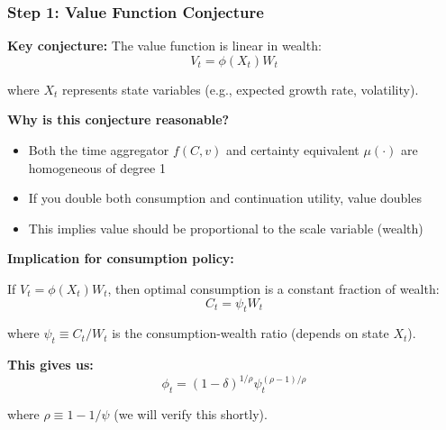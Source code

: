 \documentclass{beamer}
\begin{document}
\begin{frame}[allowframebreaks]
    \frametitle{Step 1: Value Function Conjecture}
    
    \textbf{Key conjecture:} The value function is linear in wealth:
    \begin{equation*}
        V_t = \phi(X_t) W_t
    \end{equation*}
    
    where $X_t$ represents state variables (e.g., expected growth rate, volatility).
    
    \textbf{Why is this conjecture reasonable?}
    \begin{itemize}
        \item Both the time aggregator $f(C, v)$ and certainty equivalent $\mu(\cdot)$ are homogeneous of degree 1
        \item If you double both consumption and continuation utility, value doubles
        \item This implies value should be proportional to the scale variable (wealth)
    \end{itemize}
    
    \framebreak
    
    \textbf{Implication for consumption policy:}
    
    If $V_t = \phi(X_t) W_t$, then optimal consumption is a constant fraction of wealth:
    \begin{equation*}
        C_t = \psi_t W_t
    \end{equation*}
    
    where $\psi_t \equiv C_t/W_t$ is the consumption-wealth ratio (depends on state $X_t$).
    
    \textbf{This gives us:}
    \begin{equation*}
        \phi_t = (1-\delta)^{1/\rho} \psi_t^{(\rho-1)/\rho}
    \end{equation*}
    
    where $\rho \equiv 1 - 1/\psi$ (we will verify this shortly).
\end{frame}
\end{document}

